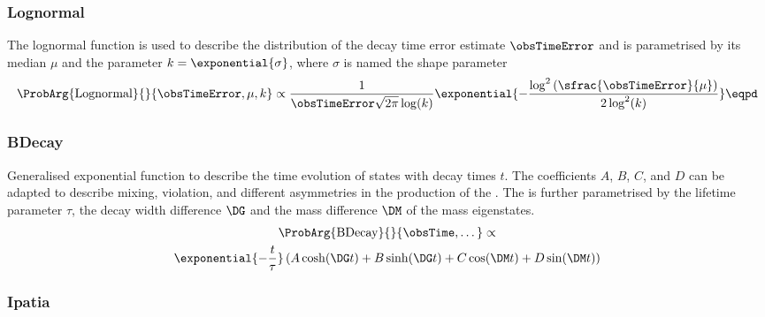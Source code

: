 \subsubsection{Lognormal}
\label{sec:measurement_of_sin2beta:likelihood_fit:pdfs:lognormal}

The lognormal function is \eg used to describe the distribution of the decay
time error estimate $\obsTimeError$ and is parametrised by its median $\mu$ and
the parameter $k = \exponential{\sigma}$, where $\sigma$ is named the shape
parameter
%
\begin{equation}\label{eq:measurement_of_sin2beta:likelihood_fit:pdfs:lognormal}
  \ProbArg{\text{Lognormal}}{}{\obsTimeError, \mu, k} \propto \frac{1}{\obsTimeError \sqrt{2\pi} \log (k)} \exponential{-\frac{\log^2 \left(\sfrac{\obsTimeError}{\mu}\right)}{2 \log^2(k)}}\eqpd
\end{equation}

\subsubsection{BDecay}
\label{sec:measurement_of_sin2beta:likelihood_fit:pdfs:bdecay}

Generalised exponential function to describe the time evolution of \Bmeson
states with decay times $t$. The coefficients $A$, $B$, $C$, and $D$ can be
adapted to describe \Bmeson mixing, \CP violation, and different asymmetries \eg
in the production of the \Bmesons. The \PDF is further parametrised by the
lifetime parameter $\tau$, the decay width difference $\DG$ and the mass
difference $\DM$ of the \Bmeson mass eigenstates.
%
\begin{multline}\label{eq:measurement_of_sin2beta:likelihood_fit:pdfs:bdecay}
  \ProbArg{\text{BDecay}}{}{\obsTime, \dots} \propto \\ \exponential{- \frac{t}{\tau}}\left( A \cosh (\DG t) + B \sinh (\DG t) + C \cos (\DM t) + D \sin (\DM t) \right)
\end{multline}

\subsubsection{Ipatia}
\label{sec:measurement_of_sin2beta:likelihood_fit:pdfs:ipatia}

